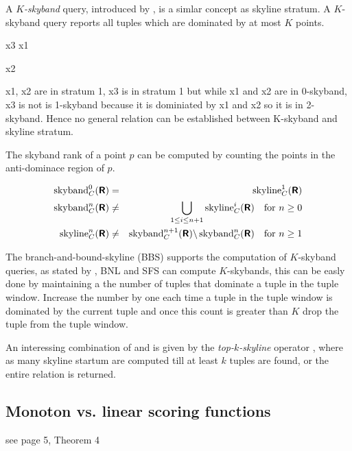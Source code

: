 A \emph{$K$-skyband} query, introduced by \citet{Papadias2005}, is a simlar concept as skyline stratum. A $K$-skyband query reports all tuples which are dominated by at most $K$ points.

        x3
  x1  
 
    x2

x1, x2 are in stratum 1, x3 is in stratum 1 but while x1 and x2 are in 0-skyband, x3 is not is 1-skyband because it is dominiated by x1 and x2 so it is in 2-skyband. Hence no general relation can be established between K-skyband and skyline stratum.

The skyband rank of a point $p$ can be computed by counting the points in the anti-dominace region of $p$.

\begin{eqnarray}
\skyband_C^0(\relation{R}) &=& \skyline_C^1(\relation{R}) \label{equ:skyband} \\
\skyband_C^n(\relation{R}) &\not=& \bigunion_{1 \le i \le n+1} \skyline_C^i(\relation{R}) \quad \textnormal{for}\ n \ge 0\label{equ:skybandgeneral} \\
\skyline_C^n(\relation{R}) &\not=& \skyband_C^{n+1}(\relation{R}) \difference \skyband_C^n(\relation{R}) \quad \textnormal{for}\ n \ge 1
\end{eqnarray}

The branch-and-bound-skyline (BBS) \citep{Papadias2005} supports the computation of $K$-skyband queries, as stated by \citet{Papadias2005}, BNL and SFS can compute $K$-skybands, this can be easly done by maintaining a the number of tuples that dominate a tuple in the tuple window. Increase the number by one each time a tuple in the tuple window is dominated by the current tuple and once this count is greater than $K$ drop the tuple from the tuple window.


An interessing combination of  and  is given by the \emph{top-$k$-skyline} operator , where as many skyline startum are computed till at least $k$ tuples are found, or the entire relation is returned.


\subsection{Monoton vs. linear scoring functions}\label{subsec:scoring}
see \citep{Chomicki2002a} page 5, Theorem 4

